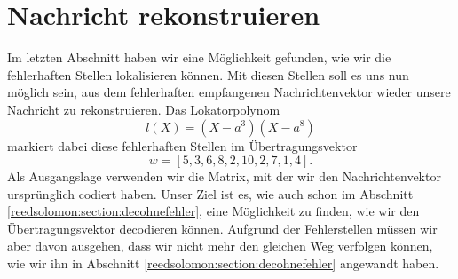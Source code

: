 %
%
%
\section{Nachricht rekonstruieren
\label{reedsolomon:section:rekonstruktion}}
Im letzten Abschnitt haben wir eine Möglichkeit gefunden, wie wir die fehlerhaften Stellen lokalisieren können.
Mit diesen Stellen soll es uns nun möglich sein, aus dem fehlerhaften empfangenen Nachrichtenvektor wieder unsere Nachricht zu rekonstruieren.
Das Lokatorpolynom
\[
l(X) = (X - a^3)(X-a^8)
\]
markiert dabei diese fehlerhaften Stellen im Übertragungsvektor
\[
w = [5,3,6,8,2,10,2,7,1,4].
\]
Als Ausgangslage verwenden wir die Matrix, mit der wir den Nachrichtenvektor ursprünglich codiert haben.
Unser Ziel ist es, wie auch schon im Abschnitt \ref{reedsolomon:section:decohnefehler}, eine Möglichkeit zu finden, wie wir den Übertragungsvektor decodieren können. 
Aufgrund der Fehlerstellen müssen wir aber davon ausgehen, dass wir nicht mehr den gleichen Weg verfolgen können, wie wir ihn in Abschnitt \ref{reedsolomon:section:decohnefehler} angewandt haben.

